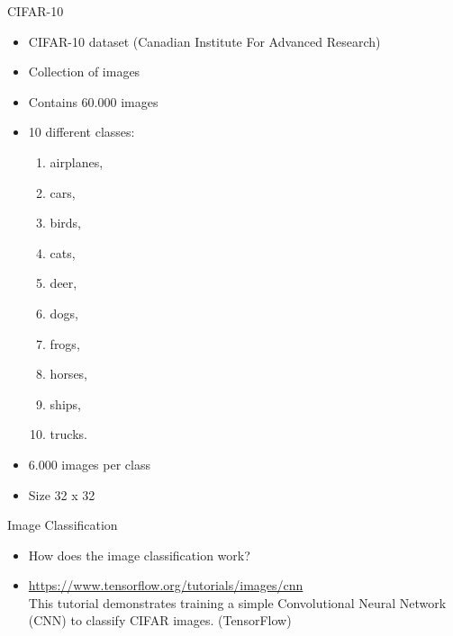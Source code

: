 \documentclass{beamer}{}
\begin{document}
    \begin{frame} {CIFAR-10}
    \begin{itemize}
        \item<+-> CIFAR-10 dataset (Canadian Institute For Advanced Research)
        \item<+-> Collection of images
        \item<+-> Contains 60.000 images
        \item<+-> 10 different classes: 
            \begin{enumerate}
                \item airplanes,
                \item cars,
                \item birds,
                \item cats,
                \item deer,
                \item dogs,
                \item frogs,
                \item horses,
                \item ships,
                \item trucks.
            \end{enumerate}
        \item<+-> 6.000 images per class
        \item<+-> Size 32 x 32
    \end{itemize}
\end{frame}

\begin{frame} {Image Classification}
    \begin{itemize}
        \item How does the image classification work?
        \item \url{https://www.tensorflow.org/tutorials/images/cnn}\\
            This tutorial demonstrates training a simple Convolutional Neural Network (CNN) to classify CIFAR images. (TensorFlow)
    \end{itemize}
\end{frame}
\end{document}
